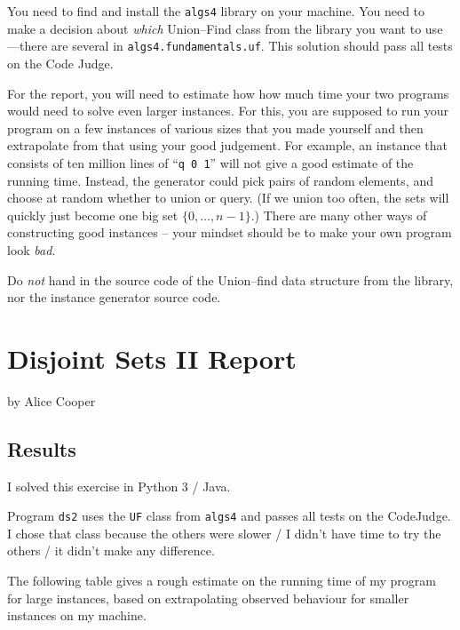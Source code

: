 \documentclass{tufte-handout}
\begin{document}
You need to find and install the \texttt{algs4} library on your machine.
You need to make a decision about \emph{which} Union--Find class from the library you want to use---there are several in \texttt{algs4.fundamentals.uf}.
This solution should pass all tests on the Code Judge.

For the report, you will need to estimate how how much time your two programs would need to solve even larger instances.
For this, you are supposed to run your program on a few instances of various sizes that you made yourself and then extrapolate from that using your good judgement.
For example, an instance that consists of ten million lines of ``\texttt{q 0 1}'' will not give a good estimate of the running time.
Instead, the generator could pick pairs of random elements, and choose at random whether to union or query.
(If we union too often, the sets will quickly just become one big set $\{0,\ldots, n-1\}$.)
There are many other ways of constructing good instances -- your mindset should be to make your own program look \emph{bad}.

Do \emph{not} hand in the source code of the Union--find data structure from the library, nor the instance generator source code.

\newpage
\section{Disjoint Sets II Report}

by Alice Cooper

  \subsection{Results}
  
  I solved this exercise in Python 3 / Java.

  Program \texttt{ds2} uses the \texttt{UF} class from \texttt{algs4} and passes all tests on the CodeJudge.
  I chose that class because the others were slower / I didn't have time to try the others / it didn't make any difference.

  The following table gives a rough estimate on the running time of my program for large instances, based on extrapolating observed behaviour for smaller instances on my machine.
\end{document}
